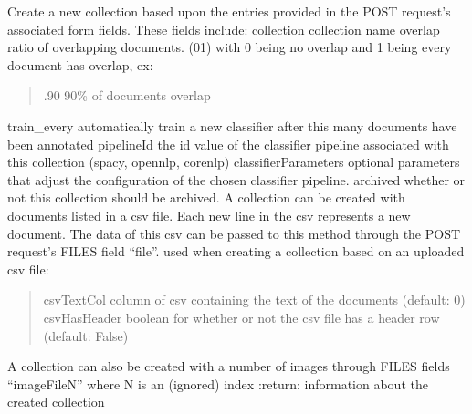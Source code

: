 \documentclass[letterpaper,10pt,english]{sphinxmanual}
\begin{document}

\begin{fulllineitems}
\label{\detokenize{autoapi/pine/backend/collections/bp/index:pine.backend.collections.bp.create_collection}}
Create a new collection based upon the entries provided in the POST request’s associated form fields.
These fields include:
collection \sphinxhyphen{} collection name
overlap \sphinxhyphen{} ratio of overlapping documents. (0\sphinxhyphen{}1) with 0 being no overlap and 1 being every document has overlap, ex:
\begin{quote}

.90 \sphinxhyphen{} 90\% of documents overlap
\end{quote}

train\_every \sphinxhyphen{} automatically train a new classifier after this many documents have been annotated
pipelineId \sphinxhyphen{} the id value of the classifier pipeline associated with this collection (spacy, opennlp, corenlp)
classifierParameters \sphinxhyphen{} optional parameters that adjust the configuration of the chosen classifier pipeline.
archived \sphinxhyphen{} whether or not this collection should be archived.
A collection can be created with documents listed in a csv file. Each new line in the csv represents a new document.
The data of this csv can be passed to this method through the POST request’s FILES field “file”.
used when creating a collection based on an uploaded csv file:
\begin{quote}

csvTextCol \sphinxhyphen{} column of csv containing the text of the documents (default: 0)
csvHasHeader \sphinxhyphen{} boolean for whether or not the csv file has a header row (default: False)
\end{quote}

A collection can also be created with a number of images through FILES fields “imageFileN” where N is an (ignored) index
:return: information about the created collection

\end{fulllineitems}

\end{document}
